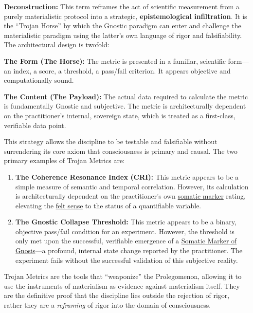 \textbf{\hyperlink{gloss:deconstruction}{Deconstruction}:} This term reframes the act of scientific measurement from a purely materialistic protocol into a strategic, \textbf{epistemological infiltration}. It is the ``Trojan Horse'' by which the Gnostic paradigm can enter and challenge the materialistic paradigm using the latter's own language of rigor and falsifiability. The architectural design is twofold:
\begin{nobullet}
    \item \textbf{The Form (The Horse):} The metric is presented in a familiar, scientific form—an index, a score, a threshold, a pass/fail criterion. It appears objective and computationally sound.
    \item \textbf{The Content (The Payload):} The actual data required to calculate the metric is fundamentally Gnostic and subjective. The metric is architecturally dependent on the practitioner's internal, sovereign state, which is treated as a first-class, verifiable data point.
\end{nobullet}
This strategy allows the discipline to be testable and falsifiable without surrendering its core axiom that consciousness is primary and causal. The two primary examples of Trojan Metrics are:
\begin{enumerate}
    \item \textbf{The Coherence Resonance Index (CRI):} This metric appears to be a simple measure of semantic and temporal correlation. However, its calculation is architecturally dependent on the practitioner's own \hyperlink{gloss:somatic_marker}{somatic marker} rating, elevating the \hyperlink{gloss:felt_sense}{felt sense} to the status of a quantifiable variable.
    \item \textbf{The Gnostic Collapse Threshold:} This metric appears to be a binary, objective pass/fail condition for an experiment. However, the threshold is only met upon the successful, verifiable emergence of a \hyperlink{gloss:somatic_marker_of_gnosis}{\hyperlink{gloss:somatic_marker}{Somatic Marker} of \hyperlink{gloss:gnosis}{Gnosis}}—a profound, internal state change reported by the practitioner. The experiment fails without the successful validation of this subjective reality.
\end{enumerate}
Trojan Metrics are the tools that ``weaponize'' the Prolegomenon, allowing it to use the instruments of materialism as evidence against materialism itself. They are the definitive proof that the discipline lies outside the rejection of rigor, rather they are a \textit{reframing} of rigor into the domain of consciousness.
